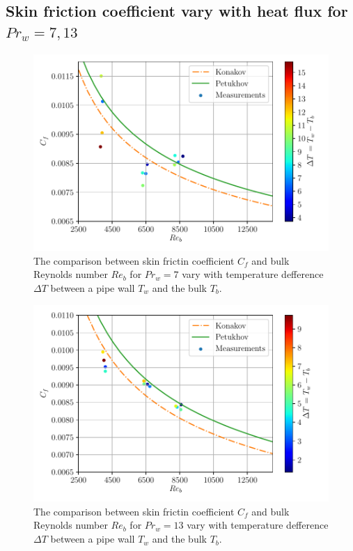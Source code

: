 \documentclass[12pt,oneside]{jbook}
\begin{document}
\subsection{Skin friction coefficient vary with heat flux for $Pr_{w}=7, 13$}
\begin{figure}[ht]
	\vspace{0zh}
	\begin{center}
		\includegraphics[width=1\linewidth]{fig/pr7heatflux_recfdt.pdf}
		\vspace{-3zh}
		\caption{The comparison between skin frictin coefficient $C_{f}$ and bulk Reynolds number $Re_{b}$ for $Pr_{w} = 7$ vary with temperature defference $\Delta T$ between a pipe wall $T_{w}$ and the bulk $T_{b}$.}
		\label{pr7_recf_heatflux}
	\end{center}
	\vspace{0zh}
\end{figure}

\begin{figure}[ht]
	\vspace{0zh}
	\begin{center}
		\includegraphics[width=1\linewidth]{fig/pr13heatflux_recfdt.pdf}
		\vspace{-3zh}
		\caption{The comparison between skin frictin coefficient $C_{f}$ and bulk Reynolds number $Re_{b}$ for $Pr_{w} = 13$ vary with temperature defference $\Delta T$ between a pipe wall $T_{w}$ and the bulk $T_{b}$.}
		\label{pr13_recf_heatflux}
	\end{center}
	\vspace{0zh}
\end{figure}
\end{document}

